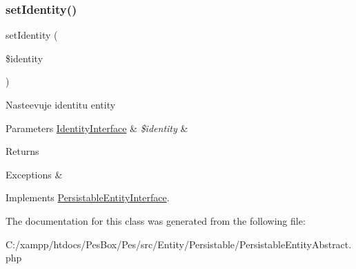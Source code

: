 \subsubsection{\texorpdfstring{set\+Identity()}{setIdentity()}}
{\footnotesize\ttfamily set\+Identity (\begin{DoxyParamCaption}\item[{\mbox{\hyperlink{interface_pes_1_1_entity_1_1_persistable_1_1_identity_interface}{Identity\+Interface}}}]{\$identity }\end{DoxyParamCaption})}

Nasteevuje identitu entity 
\begin{DoxyParams}[1]{Parameters}
\mbox{\hyperlink{interface_pes_1_1_entity_1_1_persistable_1_1_identity_interface}{Identity\+Interface}} & {\em \$identity} & \\
\hline
\end{DoxyParams}
\begin{DoxyReturn}{Returns}

\end{DoxyReturn}

\begin{DoxyExceptions}{Exceptions}
{\em } & \\
\hline
\end{DoxyExceptions}


Implements \mbox{\hyperlink{interface_pes_1_1_entity_1_1_persistable_1_1_persistable_entity_interface_a4b592a84880ccd2d9e5483195ca2fb71}{Persistable\+Entity\+Interface}}.



The documentation for this class was generated from the following file\+:\begin{DoxyCompactItemize}
\item 
C\+:/xampp/htdocs/\+Pes\+Box/\+Pes/src/\+Entity/\+Persistable/Persistable\+Entity\+Abstract.\+php\end{DoxyCompactItemize}
